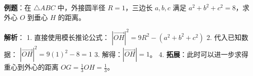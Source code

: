 \begin{examplebox}
\textbf{例题}：在 $\triangle ABC$ 中，外接圆半径 $R=1$，三边长 $a, b, c$ 满足 $a^2+b^2+c^2 = 8$，求外心 $O$ 到垂心 $H$ 的距离。

\textbf{解析}：
1. 直接使用模长推论公式：
   $|\vec{OH}|^2 = 9R^2 - (a^2 + b^2 + c^2)$
2. 代入已知数据：
   $|\vec{OH}|^2 = 9(1)^2 - 8 = 1$
3. 解得：$|\vec{OH}| = 1$。
4. \textbf{拓展}：此时可以进一步求得重心到外心的距离 $OG = \frac{1}{3}OH = \frac{1}{3}$。
\end{examplebox}
